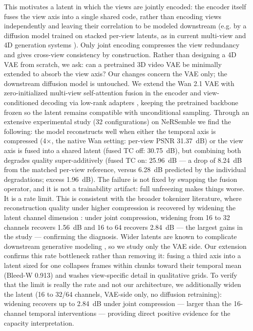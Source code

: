 This motivates a latent in which the views are jointly encoded: the encoder itself fuses the view axis into a single shared code, rather than encoding views independently and leaving their correlation to be modeled downstream (e.g. by a diffusion model trained on stacked per-view latents, as in current multi-view and 4D generation systems \cite{zuo2024videomv, xie2024sv4d}). Only joint encoding compresses the view redundancy and gives cross-view consistency by construction.
Rather than designing a 4D VAE from scratch, we ask: can a pretrained 3D video VAE be minimally extended to absorb the view axis? Our changes concern the VAE only; the downstream diffusion model is untouched. We extend the Wan 2.1 VAE \cite{wan2025wan} with
zero-initialized multi-view self-attention fusion in the encoder and view-conditioned decoding via low-rank adapters \cite{hu2022lora, zhang2023adding}, keeping the pretrained backbone frozen so the latent remains compatible with unconditional sampling.
Through an extensive experimental study (32 configurations) on NeRSemble \cite{kirschstein2023nersemble} we find the following: the model reconstructs well when either the temporal axis is compressed (4$\times$, the native Wan setting: per-view PSNR 31.37~dB) or the view axis is fused into a shared latent (fused TC off: 30.75~dB), but combining both degrades quality super-additively (fused TC on: 25.96~dB --- a drop of 8.24~dB from the matched per-view reference, versus 6.28~dB predicted by the individual degradations; excess 1.96~dB). The failure is not fixed by swapping the fusion operator, and it is not a trainability artifact: full unfreezing makes things worse. It is a rate limit. This is consistent with the broader tokenizer literature, where reconstruction quality under higher compression is recovered by widening the latent channel dimension \cite{dai2023emu, chen2024deep, hacohen2024ltx}: under joint compression, widening from 16 to 32 channels recovers 1.56~dB and 16 to 64 recovers 2.84~dB --- the largest gains in the study --- confirming the diagnosis. Wider latents are known to complicate downstream generative modeling \cite{yao2025vavae}, so we study only the VAE side.
Our extension confirms this rate bottleneck rather than removing it: fusing a third axis into a latent sized for one collapses frames within chunks toward their temporal mean (Bleed-W 0.913) and washes view-specific detail in qualitative grids. To verify that the limit is really the rate and not our architecture, we additionally widen the latent (16 to 32/64 channels, VAE-side only, no diffusion retraining): widening recovers up to 2.84~dB under joint compression --- larger than the 16-channel temporal interventions --- providing direct positive evidence for the capacity interpretation.

